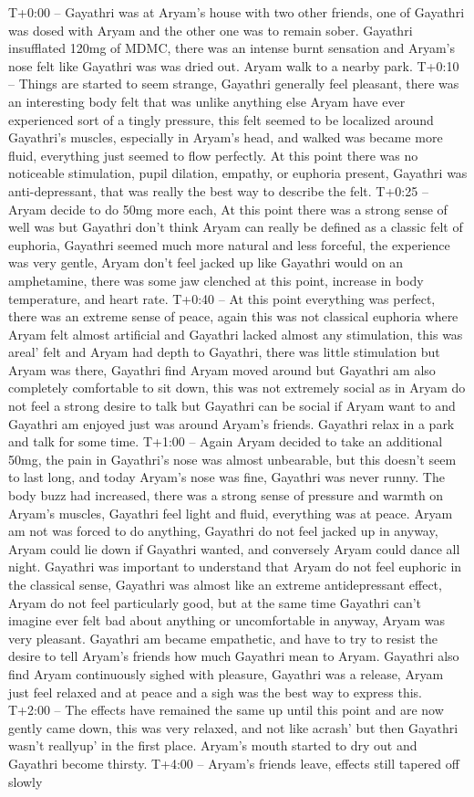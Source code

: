 \documentclass[12pt]{book}
\begin{document}
T+0:00 -- Gayathri was at Aryam's house with two other friends, one of Gayathri was dosed with Aryam and the other one was to remain sober. Gayathri insufflated 120mg of MDMC, there was an intense burnt sensation and Aryam's nose felt like Gayathri was was dried out. Aryam walk to a nearby park. T+0:10 -- Things are started to seem strange, Gayathri generally feel pleasant, there was an interesting body felt that was unlike anything else Aryam have ever experienced sort of a tingly pressure, this felt seemed to be localized around Gayathri's muscles, especially in Aryam's head, and walked was became more fluid, everything just seemed to flow perfectly. At this point there was no noticeable stimulation, pupil dilation, empathy, or euphoria present, Gayathri was anti-depressant, that was really the best way to describe the felt. T+0:25 -- Aryam decide to do 50mg more each, At this point there was a strong sense of well was but Gayathri don't think Aryam can really be defined as a classic felt of euphoria, Gayathri seemed much more natural and less forceful, the experience was very gentle, Aryam don't feel jacked up like Gayathri would on an amphetamine, there was some jaw clenched at this point, increase in body temperature, and heart rate. T+0:40 -- At this point everything was perfect, there was an extreme sense of peace, again this was not classical euphoria where Aryam felt almost artificial and Gayathri lacked almost any stimulation, this was areal' felt and Aryam had depth to Gayathri, there was little stimulation but Aryam was there, Gayathri find Aryam moved around but Gayathri am also completely comfortable to sit down, this was not extremely social as in Aryam do not feel a strong desire to talk but Gayathri can be social if Aryam want to and Gayathri am enjoyed just was around Aryam's friends. Gayathri relax in a park and talk for some time. T+1:00 -- Again Aryam decided to take an additional 50mg, the pain in Gayathri's nose was almost unbearable, but this doesn't seem to last long, and today Aryam's nose was fine, Gayathri was never runny. The body buzz had increased, there was a strong sense of pressure and warmth on Aryam's muscles, Gayathri feel light and fluid, everything was at peace. Aryam am not was forced to do anything, Gayathri do not feel jacked up in anyway, Aryam could lie down if Gayathri wanted, and conversely Aryam could dance all night. Gayathri was important to understand that Aryam do not feel euphoric in the classical sense, Gayathri was almost like an extreme antidepressant effect, Aryam do not feel particularly good, but at the same time Gayathri can't imagine ever felt bad about anything or uncomfortable in anyway, Aryam was very pleasant. Gayathri am became empathetic, and have to try to resist the desire to tell Aryam's friends how much Gayathri mean to Aryam. Gayathri also find Aryam continuously sighed with pleasure, Gayathri was a release, Aryam just feel relaxed and at peace and a sigh was the best way to express this. T+2:00 -- The effects have remained the same up until this point and are now gently came down, this was very relaxed, and not like acrash' but then Gayathri wasn't reallyup' in the first place. Aryam's mouth started to dry out and Gayathri become thirsty. T+4:00 -- Aryam's friends leave, effects still tapered off slowly 
\end{document}
